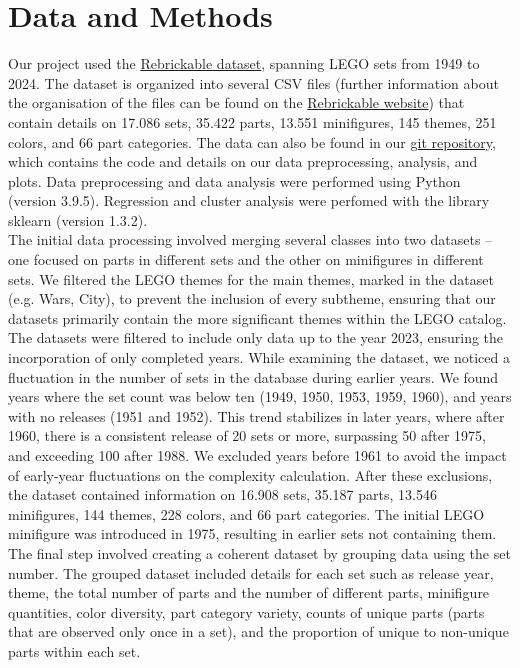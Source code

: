 \documentclass{article}
\theoremstyle{plain}
\theoremstyle{definition}
\theoremstyle{remark}
\begin{document}
	\section{Data and Methods}\label{sec:methods}
	
	Our project used the \href{https://rebrickable.com/downloads/}{Rebrickable dataset}, spanning LEGO sets from 1949 to 2024. The dataset is organized into several CSV files (further information about the organisation of the files can be found on the \href{https://rebrickable.com/downloads/}{Rebrickable website}) that contain details on 17.086 sets, 35.422 parts, 13.551 minifigures, 145 themes, 251 colors, and 66 part categories. The data can also be found in our \href{https://github.com/eddiebeach99/Data_Literacy/tree/main}{git repository}, which contains the code and details on our data preprocessing, analysis, and plots. Data preprocessing and data analysis were performed using Python (version 3.9.5). Regression and cluster analysis were perfomed with the library sklearn (version 1.3.2).\\
	The initial data processing involved merging several classes into two datasets – one focused on parts in different sets and the other on minifigures in different sets. We filtered the LEGO themes for the main themes, marked in the dataset (e.g. \@Star Wars, City), to prevent the inclusion of every subtheme, ensuring that our datasets primarily contain the more significant themes within the LEGO catalog. The datasets were filtered to include only data up to the year 2023, ensuring the incorporation of only completed years. While examining the dataset, we noticed a fluctuation in the number of sets in the database during earlier years. We found years where the set count was below ten (1949, 1950, 1953, 1959, 1960), and years with no releases (1951 and 1952). This trend stabilizes in later years, where after 1960, there is a consistent release of 20 sets or more, surpassing 50 after 1975, and exceeding 100 after 1988. We excluded years before 1961 to avoid the impact of early-year fluctuations on the complexity calculation. After these exclusions, the dataset contained information on 16.908 sets, 35.187 parts, 13.546 minifigures, 144 themes, 228 colors, and 66 part categories. The initial LEGO minifigure was introduced in 1975, resulting in earlier sets not containing them.\\
	The final step involved creating a coherent dataset by grouping data using the set number. The grouped dataset included details for each set such as release year, theme, the total number of parts and the number of different parts, minifigure quantities, color diversity, part category variety, counts of unique parts (parts that are observed only once in a set), and the proportion of unique to non-unique parts within each set.\\
\end{document}
